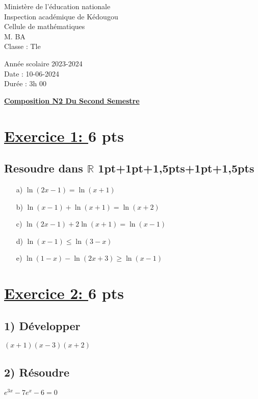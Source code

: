 \documentclass[12pt]{article}
\begin{document}
\begin{minipage}{0.5\textwidth}
	Ministère de l'éducation nationale  \\
	Inspection académique de Kédougou   \\
	Cellule de mathématiques            \\
	M. BA\\
	Classe : Tle  \\
\end{minipage}
\begin{minipage}{0.5\textwidth}
	Année scolaire 2023-2024 \\
	Date : 10-06-2024 \\
	Durée : 3h 00 \\
\end{minipage}

\begin{center}
	\textbf{{\underline{Composition N2 Du Second Semestre}}}
\end{center}
\section*{\underline{Exercice 1: }\textbf{6 pts}}
\subsection*{ Resoudre dans $\mathbb{R}$ 1pt+1pt+1,5pts+1pt+1,5pts}
\begin{itemize}
\item[a)] $\ln(2x-1)=\ln(x+1)$

\item[b)] $\ln(x-1)+\ln(x+1)=\ln(x+2)$

\item[c)] $\ln(2x-1)+2\ln(x+1)=\ln(x-1)$

\item[d)] $\ln(x-1)\leq\ln(3-x)$

\item[e)] $\ln(1-x)-\ln(2x+3)\geq\ln(x-1)$
\end{itemize}
\section*{\underline{Exercice 2: }\textbf{6 pts}}
\subsection*{ 1) Développer } $(x+1)(x-3)(x+2)$
\subsection*{ 2) Résoudre } $e^{3x}-7e^{x}-6=0$
\end{document}

